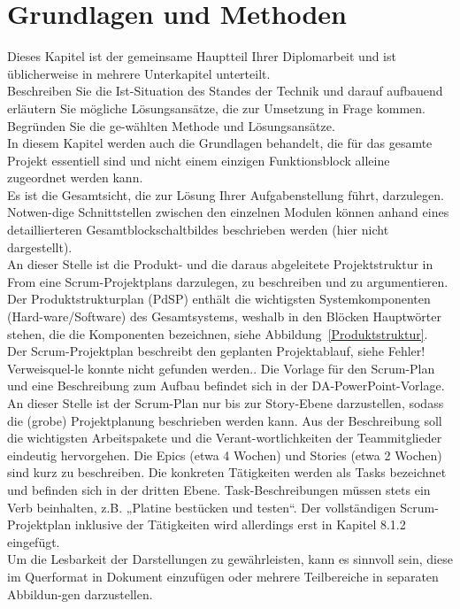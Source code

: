 \documentclass{article}
\begin{document}
\section{Grundlagen und Methoden}
\color{blue}
Dieses Kapitel ist der gemeinsame Hauptteil Ihrer Diplomarbeit und ist üblicherweise in mehrere Unterkapitel unterteilt.\\
Beschreiben Sie die Ist-Situation des Standes der Technik und darauf aufbauend erläutern Sie mögliche Lösungsansätze, die zur Umsetzung in Frage kommen. Begründen Sie die ge-wählten Methode und Lösungsansätze.\\
In diesem Kapitel werden auch die Grundlagen behandelt, die für das gesamte Projekt essentiell sind und nicht einem einzigen Funktionsblock alleine zugeordnet werden kann.\\
Es ist die Gesamtsicht, die zur Lösung Ihrer Aufgabenstellung führt, darzulegen. Notwen-dige Schnittstellen zwischen den einzelnen Modulen können anhand eines detaillierteren Gesamtblockschaltbildes beschrieben werden (hier nicht dargestellt). \\
An dieser Stelle ist die Produkt- und die daraus abgeleitete Projektstruktur in From eine Scrum-Projektplans darzulegen, zu beschreiben und zu argumentieren.\\
Der Produktstrukturplan (PdSP) enthält die wichtigsten Systemkomponenten (Hard-ware/Software) des Gesamtsystems, weshalb in den Blöcken Hauptwörter stehen, die die Komponenten bezeichnen, siehe Abbildung~\ref{Produktstruktur}. \\
Der Scrum-Projektplan beschreibt den geplanten Projektablauf, siehe Fehler! Verweisquel-le konnte nicht gefunden werden..  Die Vorlage für den Scrum-Plan und eine Beschreibung zum Aufbau befindet sich in der DA-PowerPoint-Vorlage. An dieser Stelle ist der Scrum-Plan nur bis zur Story-Ebene darzustellen, sodass die (grobe) Projektplanung beschrieben werden kann. Aus der Beschreibung soll die wichtigsten Arbeitspakete und die Verant-wortlichkeiten der Teammitglieder eindeutig hervorgehen. Die Epics (etwa 4 Wochen) und Stories (etwa 2 Wochen) sind kurz zu beschreiben. Die konkreten Tätigkeiten werden als Tasks bezeichnet und befinden sich in der dritten Ebene. Task-Beschreibungen müssen stets ein Verb beinhalten, z.B. „Platine bestücken und testen“. Der vollständigen Scrum-Projektplan inklusive der Tätigkeiten wird allerdings erst in Kapitel 8.1.2 eingefügt.\\
Um die Lesbarkeit der Darstellungen zu gewährleisten, kann es sinnvoll sein, diese im Querformat in Dokument einzufügen oder mehrere Teilbereiche in separaten Abbildun-gen darzustellen.\\
\end{document}
